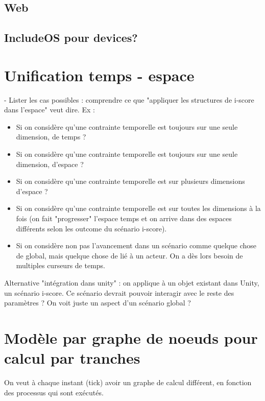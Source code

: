 \documentclass[french,a4paper,openany,12pt]{book}
\begin{document}
\subsection{Web}

\subsection{IncludeOS pour devices?}

\section{Unification temps - espace}
- Lister les cas possibles : comprendre 
ce que "appliquer les structures de i-score dans l'espace" veut dire.
Ex : 
\begin{itemize}
\item Si on considère qu'une contrainte temporelle est toujours sur une seule dimension, de temps ?
\item Si on considère qu'une contrainte temporelle est toujours sur une seule dimension, d'espace ? 
\item Si on considère qu'une contrainte temporelle est sur plusieurs dimensions d'espace ? 
\item Si on considère qu'une contrainte temporelle est sur toutes les dimensions à la fois (on fait "progresser" l'espace temps et on arrive dans des espaces différents selon les outcome du scénario i-score).
\item Si on considère non pas l'avancement dans un scénario comme quelque chose de global, mais quelque chose de lié à un acteur.
On a dès lors besoin de multiples curseurs de temps.
\end{itemize}

Alternative "intégration dans unity" : on applique à un objet existant dans Unity, un scénario i-score.
Ce scénario devrait pouvoir interagir avec le reste des paramètres ? On voit juste un aspect d'un scénario global ?

\section{Modèle par graphe de noeuds pour calcul par tranches}
On veut à chaque instant (tick) avoir un graphe de calcul différent, en fonction des processus qui sont exécutés.

\end{document}
